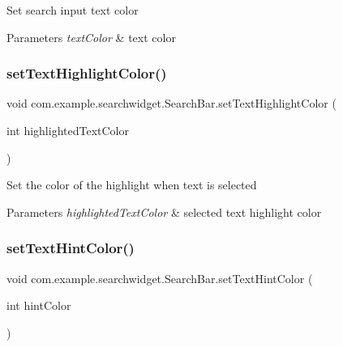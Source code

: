 Set search input text color


\begin{DoxyParams}{Parameters}
{\em text\+Color} & text color \\
\hline
\end{DoxyParams}
\mbox{\label{classcom_1_1example_1_1searchwidget_1_1_search_bar_a538551052205575951500130dc5ed591}} 
\subsubsection{\texorpdfstring{setTextHighlightColor()}{setTextHighlightColor()}}
{\footnotesize\ttfamily void com.\+example.\+searchwidget.\+Search\+Bar.\+set\+Text\+Highlight\+Color (\begin{DoxyParamCaption}\item[{int}]{highlighted\+Text\+Color }\end{DoxyParamCaption})}

Set the color of the highlight when text is selected


\begin{DoxyParams}{Parameters}
{\em highlighted\+Text\+Color} & selected text highlight color \\
\hline
\end{DoxyParams}
\mbox{\label{classcom_1_1example_1_1searchwidget_1_1_search_bar_a70b21b5c03c532cb74f64e16c992f95d}} 
\subsubsection{\texorpdfstring{setTextHintColor()}{setTextHintColor()}}
{\footnotesize\ttfamily void com.\+example.\+searchwidget.\+Search\+Bar.\+set\+Text\+Hint\+Color (\begin{DoxyParamCaption}\item[{int}]{hint\+Color }\end{DoxyParamCaption})}

